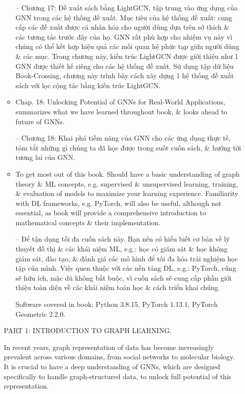 \documentclass{article}
\begin{document}
\begin{itemize}
\begin{itemize}
        -- Chương 17: Đề xuất sách bằng LightGCN, tập trung vào ứng dụng của GNN trong các hệ thống đề xuất. Mục tiêu của hệ thống đề xuất: cung cấp các đề xuất được cá nhân hóa cho người dùng dựa trên sở thích \& các tương tác trước đây của họ. GNN rất phù hợp cho nhiệm vụ này vì chúng có thể kết hợp hiệu quả các mối quan hệ phức tạp giữa người dùng \& các mục. Trong chương này, kiến trúc LightGCN được giới thiệu như 1 GNN được thiết kế riêng cho các hệ thống đề xuất. Sử dụng tập dữ liệu Book-Crossing, chương này trình bày cách xây dựng 1 hệ thống đề xuất sách với lọc cộng tác bằng kiến trúc LightGCN.
        \item Chap. 18: Unlocking Potential of GNNs for Real-World Applications, summarizes what we have learned throughout book, \& looks ahead to future of GNNs.

        -- Chương 18: Khai phá tiềm năng của GNN cho các ứng dụng thực tế, tóm tắt những gì chúng ta đã học được trong suốt cuốn sách, \& hướng tới tương lai của GNN.
        \item {\sf To get most out of this book.} Should have a basic understanding of graph theory \& ML concepts, e.g. supervised \& unsupervised learning, training, \& evaluation of models to maximize your learning experience. Familiarity with DL frameworks, e.g. PyTorch, will also be useful, although not essential, as book will provide a comprehensive introduction to mathematical concepts \& their implementation.

        -- {\sf Để tận dụng tối đa cuốn sách này.} Bạn nên có hiểu biết cơ bản về lý thuyết đồ thị \& các khái niệm ML, e.g.: học có giám sát \& học không giám sát, đào tạo, \& đánh giá các mô hình để tối đa hóa trải nghiệm học tập của mình. Việc quen thuộc với các nền tảng DL, e.g.: PyTorch, cũng sẽ hữu ích, mặc dù không bắt buộc, vì cuốn sách sẽ cung cấp phần giới thiệu toàn diện về các khái niệm toán học \& cách triển khai chúng.

        Software covered in book: Python 3.8.15, PyTorch 1.13.1, PyTorch Geometric 2.2.0.
    \end{itemize}

    PART 1: INTRODUCTION TO GRAPH LEARNING.

    In recent years, graph representation of data has become increasingly prevalent across various domains, from social networks to molecular biology. It is crucial to have a deep understanding of GNNs, which are designed specifically to handle graph-structured data, to unlock full potential of this representation.


\end{itemize}
\end{document}
